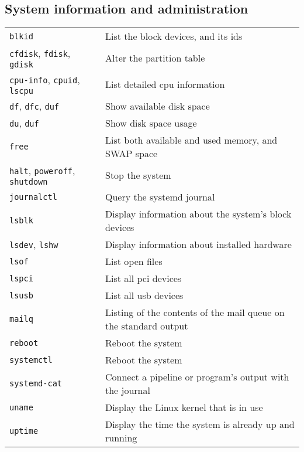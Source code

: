 \documentclass[10pt]{article}
\begin{document}
\cheatsheet

\begin{multicols}{2}

\section{System information and administration}
\begin{tabular}{ p{2.5cm} p{8.5cm} }
  \hline
  \texttt{blkid} & List the block devices, and its ids \\
  \texttt{cfdisk}, \texttt{fdisk}, \texttt{gdisk} & Alter the partition table \\
  \texttt{cpu-info}, \texttt{cpuid}, \texttt{lscpu} & List detailed cpu information \\
  \texttt{df}, \texttt{dfc}, \texttt{duf} & Show available disk space \\
  \texttt{du}, \texttt{duf} & Show disk space usage \\
  \texttt{free} & List both available and used memory, and SWAP space  \\
  \texttt{halt}, \texttt{poweroff}, \texttt{shutdown} & Stop the system \\
  \texttt{journalctl} & Query the systemd journal \\
  \texttt{lsblk} & Display information about the system's block devices\\
  \texttt{lsdev}, \texttt{lshw} & Display information about installed hardware\\
  \texttt{lsof} & List open files \\
  \texttt{lspci} & List all pci devices\\
  \texttt{lsusb} & List all usb devices\\
  \texttt{mailq} & Listing of the contents of the mail queue on the standard output\\
  \texttt{reboot} & Reboot the system\\
  \texttt{systemctl} & Reboot the system\\
  \texttt{systemd-cat} & Connect a pipeline or program's output with the journal\\
  \texttt{uname} & Display the Linux kernel that is in use\\
  \texttt{uptime} & Display the time the system is already up and running\\
  \hline
\end{tabular}

~\\
\vfill


\end{multicols}
\end{document}
